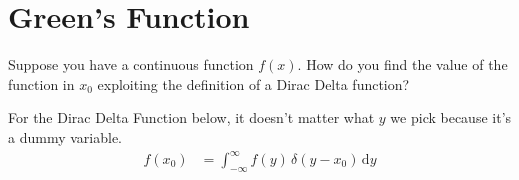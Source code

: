 \documentclass[10pt]{article}
\begin{document}
\newpage
\part{Green's Function} 
\begin{prob}
Suppose you have a continuous function $f(x)$. How do you find the value of the function in $x_0$ exploiting the definition of a Dirac Delta function? 
\end{prob}
\begin{solu}
	For the Dirac Delta Function below, it doesn't matter what $y$ we pick because it's a dummy variable.
	\begin{align*}
		f(x_0) &= \int_{-\infty}^{\infty} f(y) \, \delta(y - x_0) \, \mathrm{d} y  \\
	\end{align*}
\end{solu}
\end{document}

